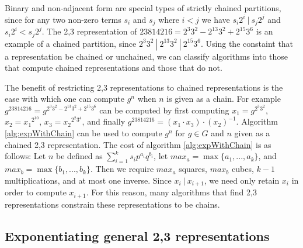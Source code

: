 \documentclass{ucalgthes1}
\theoremstyle{plain}
\theoremstyle{definition}
\begin{document}
\noindent
Binary and non-adjacent form are special types of strictly chained partitions, since for any two non-zero terms $s_i$ and $s_j$ where $i < j$ we have $s_i2^i ~|~ s_j2^j$ and $s_i2^i < s_j2^j$.  The 2,3 representation of $23814216 = 2^3 3^2 - 2^{13} 3^2 + 2^{15} 3^6$ is an example of a chained partition, since $2^3 3^2 ~|~ 2^{13} 3^2 ~|~ 2^{15} 3^6$.  Using the constaint that a representation be chained or unchained, we can classify algorithms into those that compute chained representations and those that do not.

The benefit of restricting 2,3 representations to chained representations is the ease with which one can compute $g^n$ when $n$ is given as a chain.  For example $g^{23814216} = g^{2^3 3^2 - 2^{13} 3^2 + 2^{15} 3^6}$ can be computed by first computing $x_1 = g^{2^3 3^2}$, $x_2 = {x_1}^{2^{10}}$, $x_3 = {x_2}^{2^2 3^4}$, and finally $g^{23814216} = \left(x_1 \cdot x_3\right) \cdot \left(x_2\right)^{-1}$.  Algorithm \ref{alg:expWithChain} can be used to compute $g^n$ for $g \in G$ and $n$ given as a chained 2,3 representation.  The cost of algorithm \ref{alg:expWithChain} is as follows: Let $n$ be defined as $\sum_{i=1}^k s_i p^{a_i}q^{b_i}$, let $max_a = \max \{a_1,...,a_k\}$, and $max_b = \max \{b_1,...,b_k\}$.  Then we require $max_a$ squares, $max_b$ cubes, $k-1$ multiplications, and at most one inverse.  Since $x_i ~|~ x_{i+1}$, we need only retain $x_i$ in order to compute $x_{i+1}$. For this reason, many algorithms that find 2,3 representations constrain these representations to be chains.


\bigbreak
\subsection{Exponentiating general 2,3 representations}
\end{document}
